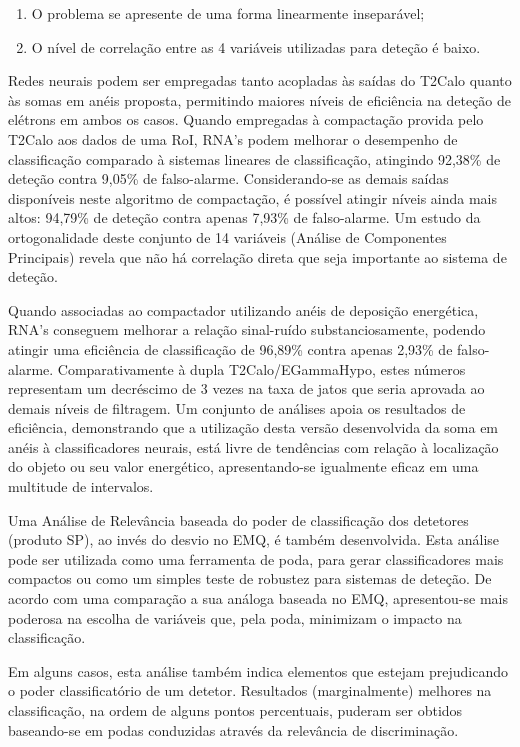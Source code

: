 \begin{enumerate}
\item O problema se apresente de uma forma linearmente inseparável;
\item O nível de correlação entre as 4 variáveis utilizadas para deteção é
baixo.
\end{enumerate}

Redes neurais podem ser empregadas tanto acopladas às saídas do T2Calo quanto
às somas em anéis proposta, permitindo maiores níveis de eficiência na deteção
de elétrons em ambos os casos. Quando empregadas à compactação provida pelo
T2Calo aos dados de uma RoI, RNA's podem melhorar o desempenho de
classificação comparado à sistemas lineares de classificação, atingindo
92,38\% de deteção contra 9,05\% de falso-alarme. Considerando-se as demais
saídas disponíveis neste algoritmo de compactação, é possível atingir níveis
ainda mais altos: 94,79\% de deteção contra apenas 7,93\% de falso-alarme. Um
estudo da ortogonalidade deste conjunto de 14 variáveis (Análise de
Componentes Principais) revela que não há correlação direta que seja
importante ao sistema de deteção.

Quando associadas ao compactador utilizando anéis de deposição energética,
RNA's conseguem melhorar a relação sinal-ruído substanciosamente, podendo
atingir uma eficiência de classificação de 96,89\% contra apenas 2,93\% de
falso-alarme. Comparativamente à dupla T2Calo/EGammaHypo, estes números
representam um decréscimo de 3 vezes na taxa de jatos que seria aprovada ao
demais níveis de filtragem. Um conjunto de análises apoia os resultados de
eficiência, demonstrando que a utilização desta versão desenvolvida da soma em
anéis à classificadores neurais, está livre de tendências com relação à
localização do objeto ou seu valor energético, apresentando-se igualmente
eficaz em uma multitude de intervalos.

Uma Análise de Relevância baseada do poder de classificação dos detetores
(produto SP), ao invés do desvio no EMQ, é também desenvolvida. Esta análise
pode ser utilizada como uma ferramenta de poda, para gerar classificadores
mais compactos ou como um simples teste de robustez para sistemas de
deteção. De acordo com uma comparação a sua análoga baseada no EMQ, apresentou-se
mais poderosa na escolha de variáveis que, pela poda, minimizam o impacto na
classificação.

Em alguns casos, esta análise também indica elementos que estejam prejudicando
o poder classificatório de um detetor. Resultados (marginalmente) melhores na
classificação, na ordem de alguns pontos percentuais, puderam ser obtidos
baseando-se em podas conduzidas através da relevância de discriminação.

